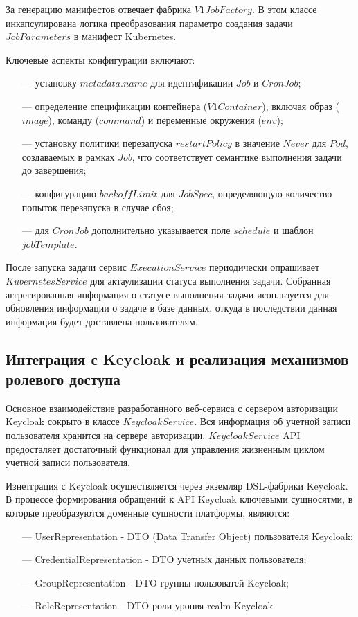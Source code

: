 За генерацию манифестов отвечает фабрика\cite{cooper2000java} $V1JobFactory$. 
В этом классе инкапсулирована логика преобразования параметро создания задачи $JobParameters$ в манифест Kubernetes.

Ключевые аспекты конфигурации включают:

\begin{itemize}
\item[---] установку $metadata.name$ для идентификации $Job$ и $CronJob$;
\item[---] определение спецификации контейнера ($V1Container$), включая образ ($image$), команду ($command$) и переменные окружения ($env$);
\item[---] установку политики перезапуска $restartPolicy$ в значение $Never$ для $Pod$, создаваемых в рамках $Job$, что соответствует семантике выполнения задачи до завершения;
\item[---] конфигурацию $backoffLimit$ для $JobSpec$, определяющую количество попыток перезапуска в случае сбоя;
\item[---] для $CronJob$ дополнительно указывается поле $schedule$ и шаблон $jobTemplate$.
\end{itemize}

После запуска задачи сервис $ExecutionService$ периодически опрашивает $KubernetesService$ для актаулизации статуса выполнения задачи.
Собранная аггрегированная информация о статусе выполнения задачи исопльзуется для обновления информации о задаче в базе данных, откуда в последствии данная информация будет доставлена пользователям.

\subsection{Интеграция с Keycloak и реализация механизмов ролевого доступа}

Основное взаимодействие разработанного веб-сервиса с сервером авторизации Keycloak сокрыто в классе $KeycloakService$.
Вся информация об учетной записи пользователя хранится на сервере авторизации.
$KeycloakService$ API предосталяет достаточный функционал для управления жизненным циклом учетной записи пользователя.

Изнетграция с Keycloak осуществляется через экземляр DSL-фабрики Keycloak.
В процессе формирования обращений к API Keycloak ключевыми сущносятми, в которые преобразуются доменные сущности платформы, являются:

\begin{itemize}
  \item[---] UserRepresentation - DTO (Data Transfer Object) пользователя Keycloak;
  \item[---] CredentialRepresentation - DTO учетных данных пользователя;
  \item[---] GroupRepresentation - DTO группы пользоватей Keycloak;
  \item[---] RoleRepresentation - DTO роли уронвя realm Keycloak.
\end{itemize}

